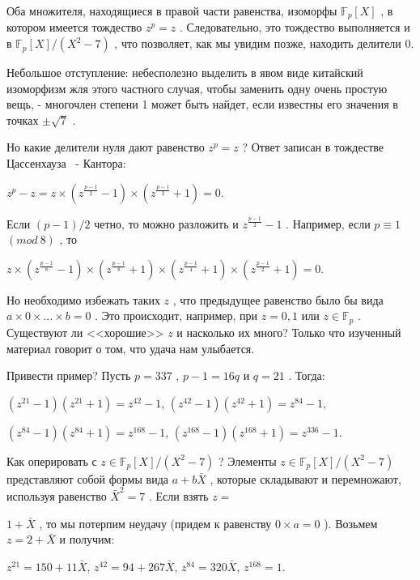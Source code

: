 \documentclass{mai_book}
\begin{document}
Оба множителя, находящиеся в правой части равенства, изоморфы $\mathbb{F}_p[X]$
, в котором имеется тождество $z^p=z$
. Следовательно, это тождество выполняется и в $\mathbb{F}_p[X]/(X^2-7)$
, что позволяет, как мы увидим позже, находить делители 0.

Небольшое отступление: небесполезно выделить в явом виде китайский изоморфизм жля этого частного случая, чтобы заменить одну очень простую вещь, - многочлен степени 1 может быть найдет, если известны его значения в точках $\pm\sqrt 7$
.

Но какие делители нуля дают равенство $z^p=z$
? Ответ записан в тождестве Цассенхауза ~- Кантора:

\begin{center}
$z^p-z=z\times(z^{\frac{p-1}{2}}-1)\times(z^{\frac{p-1}{2}}+1)=0$.
\end{center}


Если $(p-1)/2$
 четно, то можно разложить и $z^{\frac{p-1}{2}}-1$
 . Например, если $p\equiv 1$ $(mod \ 8)$
, то

\begin{center}
$z\times(z^{\frac{p-1}{8}}-1)\times(z^{\frac{p-1}{8}}+1)\times(z^{\frac{p-1}{4}}+1)\times(z^{\frac{p-1}{2}}+1)=0$.
\end{center}


Но необходимо избежать таких $z$
, что предыдущее равенство было бы вида $a\times 0\times\dots\times b =0$
. Это происходит, например, при $z=0,1$
 или $z\in\mathbb{F}_p$
 . Существуют ли <<хорошие>> $z$
 и насколько их много? Только что изученный материал говорит о том, что удача нам улыбается.

Привести пример? Пусть $p=337$
, $p-1=16q$ и $q=21$
. Тогда:

\begin{center}
$(z^{21}-1)(z^{21}+1)=z^{42}-1$, $(z^{42}-1)(z^{42}+1)=z^{84}-1$,

$(z^{84}-1)(z^{84}+1)=z^{168}-1$, $(z^{168}-1)(z^{168}+1)=z^{336}-1$.
\end{center}


Как оперировать с $z\in\mathbb{F}_p[X]/(X^2-7)$
? Элементы $z\in\mathbb{F}_p[X]/(X^2-7)$
 представляют собой формы вида $a+b\bar X$
 , которые складывают и перемножают, используя равенство $\bar X^2 = 7$
. Если взять $z=$


\newpage

$1+\bar X$
, то мы потерпим неудачу (придем к равенству $0\times a = 0$
    ). Возьмем $z=2+\bar X$
 и получим:

\begin{center}
$z^{21}=150+11\bar X$, $z^{42}=94+267\bar X$, $z^{84}=320\bar X$, $z^{168}=1$.
\end{center}
\end{document}
